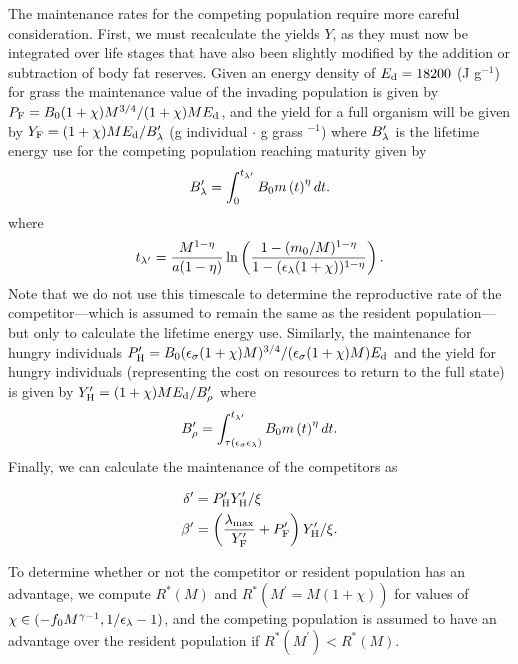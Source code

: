 \documentclass[twocolumn,preprintnumbers,amsmath,amssymb,superscriptaddress]{revtex4}
\begin{document}
{The maintenance rates for the competing population require more careful consideration.
First, we must recalculate the yields $Y$, as they must now be integrated over life stages that have also been slightly modified by the addition or subtraction of body fat reserves.
Given an energy density of $E_{\rm d}=18200$ (J g$^{-1}$) for grass \citep{estermann} the maintenance value of the invading population is given by $P_{\rm F}=B_{\rm 0}(1+\chi)M^{3/4}/(1+\chi)ME_{\rm d}$, and the yield for a full organism will be given by $Y_{\rm F}=(1+\chi)ME_{\rm d}/B^{\prime}_{\rm \lambda}$ (g individual $\cdot$ g grass $^{-1}$) where $B^{\prime}_{\rm \lambda}$ is the lifetime energy use for the competing population reaching maturity given by
\begin{equation}
B^{\prime}_{\rm \lambda}=\int_{\rm 0}^{t_{\rm \lambda^\prime}}B_{\rm 0}m\left(t\right)^{\eta}dt.
\end{equation}
where
\begin{equation}
t_{\rm \lambda^\prime} = \frac{M^{1-\eta} }{a(1-\eta)}\ln \left(\frac{1-(m_0/M)^{1-\eta}}{1-(\epsilon_\lambda (1+\chi))^{1-\eta}} \right).
\end{equation}
Note that we do not use this timescale to determine the reproductive rate of the competitor---which is assumed to remain the same as the resident population---but only to calculate the lifetime energy use.
Similarly, the maintenance for hungry individuals $P^\prime_{\rm H}=B_{\rm 0}(\epsilon_{\rm \sigma}(1+\chi)M)^{3/4}/(\epsilon_{\rm \sigma}(1+\chi)M)E_{\rm d}$ and the yield for hungry individuals (representing the cost on resources to return to the full state) is given by $Y^\prime_{\rm H}=(1+\chi)ME_{\rm d}/B^{\prime}_{\rm \rho}$ where
\begin{equation}
B^{\prime}_{\rm \rho}=\int_{\rm \tau\left(\epsilon_{\rm \sigma}\epsilon_{\rm \lambda}\right)}^{t_{\rm \lambda^\prime}}B_{\rm 0}m\left(t\right)^{\eta}dt.
\end{equation}
Finally, we can calculate the maintenance of the competitors as

\begin{align}
  \delta^\prime &= P^\prime_{\rm H}Y^\prime_{\rm H}/\xi \\ \nonumber
  \beta^\prime &= \left(\frac{\lambda_{\rm \rm max}}{Y^\prime_{\rm F}}+P^\prime_{\rm F} \right)Y^\prime_{\rm H}/\xi.
\end{align}

To determine whether or not the competitor or resident population has an advantage, we compute $R^*(M)$ and $R^*(M^\prime=M(1+\chi))$ for values of $\chi \in (-f_0M^{\gamma-1},1/\epsilon_{\rm \lambda}-1)$, and the competing population is assumed to have an advantage over the resident population if $R^*(M^\prime)<R^*(M)$.
}\\
\end{document}
